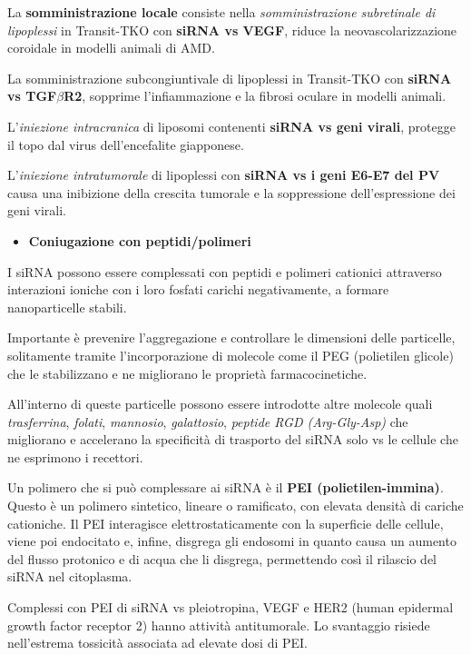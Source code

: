 \documentclass[]{article}
\begin{document}
La \textbf{somministrazione locale} consiste nella
\emph{somministrazione subretinale di lipoplessi} in Transit-TKO con
\textbf{siRNA vs VEGF}, riduce la neovascolarizzazione coroidale in
modelli animali di AMD.

La somministrazione subcongiuntivale di lipoplessi in Transit-TKO con
\textbf{siRNA vs TGF\(\beta\)R2}, sopprime l'infiammazione e la fibrosi
oculare in modelli animali.

L'\emph{iniezione intracranica} di liposomi contenenti \textbf{siRNA vs
geni virali}, protegge il topo dal virus dell'encefalite giapponese.

L'\emph{iniezione intratumorale} di lipoplessi con \textbf{siRNA vs i
geni E6-E7 del PV} causa una inibizione della crescita tumorale e la
soppressione dell'espressione dei geni virali.

\begin{itemize}
\itemsep1pt\parskip0pt
\item
  \textbf{Coniugazione con peptidi/polimeri}
\end{itemize}

I siRNA possono essere complessati con peptidi e polimeri cationici
attraverso interazioni ioniche con i loro fosfati carichi negativamente,
a formare nanoparticelle stabili.

Importante è prevenire l'aggregazione e controllare le dimensioni delle
particelle, solitamente tramite l'incorporazione di molecole come il PEG
(polietilen glicole) che le stabilizzano e ne migliorano le proprietà
farmacocinetiche.

All'interno di queste particelle possono essere introdotte altre
molecole quali \emph{trasferrina}, \emph{folati}, \emph{mannosio},
\emph{galattosio}, \emph{peptide RGD (Arg-Gly-Asp)} che migliorano e
accelerano la specificità di trasporto del siRNA solo vs le cellule che
ne esprimono i recettori.

Un polimero che si può complessare ai siRNA è il \textbf{PEI
(polietilen-immina)}. Questo è un polimero sintetico, lineare o
ramificato, con elevata densità di cariche cationiche. Il PEI
interagisce elettrostaticamente con la superficie delle cellule, viene
poi endocitato e, infine, disgrega gli endosomi in quanto causa un
aumento del flusso protonico e di acqua che li disgrega, permettendo
così il rilascio del siRNA nel citoplasma.

Complessi con PEI di siRNA vs pleiotropina, VEGF e HER2 (human epidermal
growth factor receptor 2) hanno attività antitumorale. Lo svantaggio
risiede nell'estrema tossicità associata ad elevate dosi di PEI.
\end{document}
